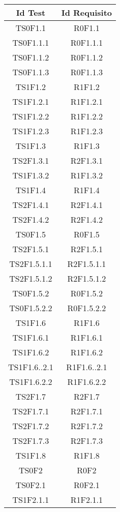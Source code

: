     \begin{longtable}{|c|c|}
    	\hline
    	\textbf{Id Test} & \textbf{Id Requisito}\\
    	\hline
    	\endhead
    	TS0F1.1&R0F1.1\\ \hline
    	TS0F1.1.1&R0F1.1.1 \\ \hline
    	TS0F1.1.2&R0F1.1.2 \\ \hline
    	TS0F1.1.3&R0F1.1.3 \\ \hline
    	TS1F1.2&R1F1.2 \\ \hline
    	TS1F1.2.1&R1F1.2.1 \\ \hline
    	TS1F1.2.2&R1F1.2.2 \\ \hline
    	TS1F1.2.3&R1F1.2.3 \\ \hline
    	TS1F1.3&R1F1.3 \\ \hline
    	TS2F1.3.1&R2F1.3.1 \\ \hline
    	TS1F1.3.2&R1F1.3.2 \\ \hline
    	TS1F1.4&R1F1.4 \\ \hline
    	TS2F1.4.1&R2F1.4.1 \\ \hline
    	TS2F1.4.2&R2F1.4.2 \\ \hline
    	TS0F1.5&R0F1.5 \\ \hline
    	TS2F1.5.1&R2F1.5.1 \\ \hline
    	TS2F1.5.1.1&R2F1.5.1.1 \\ \hline
    	TS2F1.5.1.2&R2F1.5.1.2 \\ \hline
    	TS0F1.5.2&R0F1.5.2 \\ \hline
    	TS0F1.5.2.2&R0F1.5.2.2 \\ \hline
    	TS1F1.6&R1F1.6 \\ \hline
    	TS1F1.6.1&R1F1.6.1 \\ \hline
    	TS1F1.6.2&R1F1.6.2 \\ \hline
    	TS1F1.6..2.1&R1F1.6..2.1 \\ \hline
    	TS1F1.6.2.2&R1F1.6.2.2 \\ \hline
    	TS2F1.7&R2F1.7 \\ \hline
    	TS2F1.7.1&R2F1.7.1 \\ \hline
    	TS2F1.7.2&R2F1.7.2 \\ \hline
    	TS2F1.7.3&R2F1.7.3 \\ \hline
    	TS1F1.8&R1F1.8 \\ \hline
    	TS0F2&R0F2 \\ \hline
    	TS0F2.1&R0F2.1 \\ \hline
    	TS1F2.1.1&R1F2.1.1 \\ \hline

\end{longtable}
